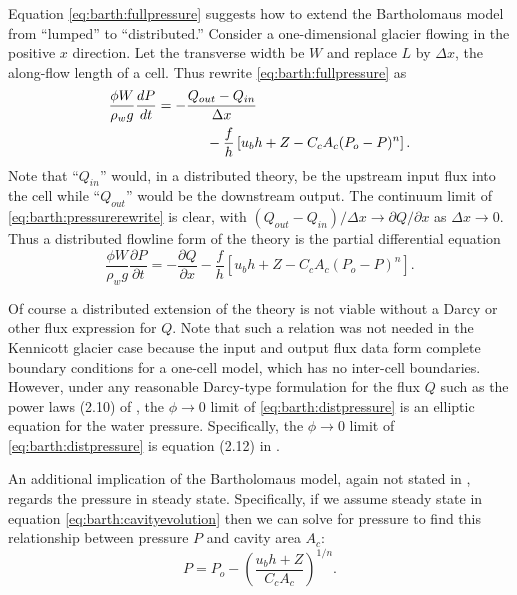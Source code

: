 \documentclass[twocolumn,letterpaper]{igs}
\begin{document}
Equation \eqref{eq:barth:fullpressure} suggests how to extend the Bartholomaus model from ``lumped'' to ``distributed.''  Consider a one-dimensional glacier flowing in the positive $x$ direction.  Let the transverse width be $W$ and replace $L$ by $\Delta x$, the along-flow length of a cell.  Thus rewrite \eqref{eq:barth:fullpressure} as
\begin{align}
&\frac{\phi W}{\rho_w g}\frac{dP}{dt} = - \frac{Q_{out} - Q_{in}}{\Delta x}  \label{eq:barth:pressurerewrite} \\
&\qquad \qquad \qquad \quad - \frac{f}{h} \left[u_b h + Z - C_c A_c (P_o-P)^n\right]. \notag
\end{align}
Note that ``$Q_{in}$'' would, in a distributed theory, be the upstream input flux into the cell while ``$Q_{out}$'' would be the downstream output.  The continuum limit of \eqref{eq:barth:pressurerewrite} is clear, with $(Q_{out} - Q_{in})/\Delta x \to \partial Q/\partial x$ as $\Delta x \to 0$.  Thus a distributed flowline form of the \cite{Bartholomausetal2011} theory is the partial differential equation
\begin{equation}
\frac{\phi W}{\rho_w g} \frac{\partial P}{\partial t} = - \frac{\partial Q}{\partial x} - \frac{f}{h} \left[u_b h + Z - C_c A_c (P_o-P)^n\right]. \label{eq:barth:distpressure}
\end{equation}

Of course a distributed extension of the \cite{Bartholomausetal2011} theory is not viable without a Darcy or other flux expression for $Q$.  Note that such a relation was not needed in the Kennicott glacier case because the input and output flux data form complete boundary conditions for a one-cell model, which has no inter-cell boundaries.  However, under any reasonable Darcy-type formulation for the flux $Q$ such as the power laws (2.10) of \cite{Schoofetal2012}, the $\phi\to 0$ limit of \eqref{eq:barth:distpressure} is an elliptic equation for the water pressure.  Specifically, the $\phi\to 0$ limit of \eqref{eq:barth:distpressure} is equation (2.12) in \cite{Schoofetal2012}.

An additional implication of the Bartholomaus model, again not stated in \cite{Bartholomausetal2011}, regards the pressure in steady state.  Specifically, if we assume steady state in equation \eqref{eq:barth:cavityevolution} then we can solve for pressure to find this relationship between pressure $P$ and cavity area $A_c$:
\begin{equation}
P = P_o - \left(\frac{u_b h + Z}{C_c A_c}\right)^{1/n}. \label{eq:barth:steadypressure}
\end{equation}
\end{document}
